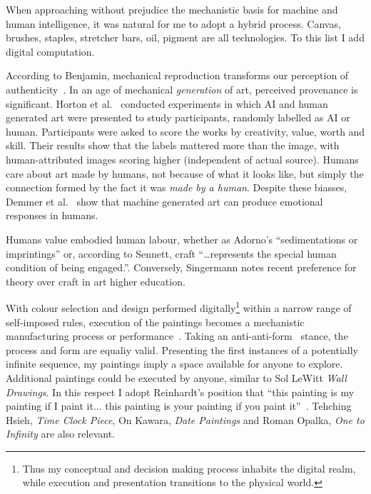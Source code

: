 \documentclass[12pt]{article}
\begin{document}
When approaching without prejudice the mechanistic basis for machine
and human intelligence, it was natural for me to adopt a hybrid
process.  Canvas, brushes, staples, stretcher bars, oil, pigment are
all technologies. To this list I add digital computation.

According to Benjamin, mechanical reproduction transforms our
perception of authenticity~\cite{benjamin1969art}. In an age of
mechanical \emph{generation} of art, perceived provenance is
significant. Horton et al.~\cite{horton2023bias} conducted experiments
in which AI and human generated art were presented to study
participants, randomly labelled as AI or human. Participants were
asked to score the works by creativity, value, worth and skill. Their
results show that the labels mattered more than the image, with
human-attributed images scoring higher (independent of actual source).
Humans care about art made by humans, not because of what it looks
like, but simply the connection formed by the fact it was \emph{made
  by a human}. Despite these biasses, Demmer et
al.~\cite{demmer2023does} show that machine generated art can produce
emotional responses in humans.

Humans value embodied human labour, whether as Adorno's
``sedimentations or imprintings''\cite[p. 5]{adorno1970aesthetic} or,
according to Sennett, craft ``\dots represents the special human
condition of being engaged.''\cite[p. 20]{sennett2008craftsman}.
Conversely, Singermann notes recent preference for theory over craft in
art higher education.\cite[p. 23-27]{singerman1999artist}

With colour selection and design performed digitally\footnote{Thus my
  conceptual and decision making process inhabits the digital realm,
  while execution and presentation transitions to the physical world.}
within a narrow range of self-imposed rules, execution of the
paintings becomes a mechanistic manufacturing process or
performance~\cite[Sentence
\#28]{LeWitt1969Sentences}\cite{Jones1998BodyArt,LippardChandler1968Dematerialization,lippard1973sixyears}. Taking
an anti-anti-form~\cite{Morris1968AntiForm} stance, the process and
form are equaliy valid.  Presenting the first instances of a
potentially infinite sequence, my paintings imply a space available
for anyone to explore. Additional paintings could be executed by
anyone, similar to Sol LeWitt \emph{Wall Drawings}. In this respect I
adopt Reinhardt's position that ``this painting is my painting if I
paint it... this painting is your painting if you paint
it''~\cite{abstract-painting-1960}. Tehching Hsieh, \emph{Time Clock
  Piece}, On Kawara, \emph{Date Paintings} and Roman Opalka, \emph{One
  to Infinity} are also relevant.
\end{document}
